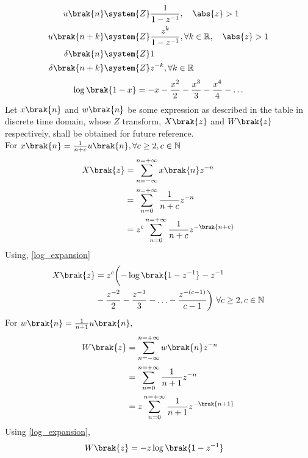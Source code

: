 \begin{table}[ht]

\end{table}
\begin{align}
	u\brak{n} &\system{Z} \frac{1}{1-z^{-1}} , \quad \abs{z} > 1\\
	u\brak{n+k} &\system{Z} \frac{z^k}{1-z^{-1}}, \forall k\in \mathbb{R}, \quad \abs{z} > 1  \label{Z_trans_pair}\\
	\delta\brak{n} &\system{Z} 1 \\
	\delta\brak{n+k} &\system{Z}z^{-k} ,\forall k\in \mathbb{R} \label{11027_eq2}
\end{align}
\begin{align}
        \log\brak{1-x} = -x - \frac{x^2}{2} - \frac{x^3}{3}-\frac{x^4}{4}- \ldots \label{log_expansion}
\end{align}
Let $x\brak{n}$ and $w\brak{n}$ be some expression as described in the table in discrete time domain, whose $Z$ transform, $X\brak{z}$ and $W\brak{z}$ respectively, shall be obtained for future reference.\\
For  $x\brak{n} = \frac{1}{n+c} u\brak{n},\forall c \geq 2,c \in \mathbb{N}$
\begin{align}
    X\brak{z} &= \sum_{n= -\infty}^{n= +\infty} x\brak{n}z^{-n}\\
    &=\sum_{n = 0}^{n = +\infty} \frac{1}{n+c}z^{-n}\\
    &= z^c\sum_{n = 0}^{n = +\infty} \frac{1}{n+c}z^{-\brak{n+c}}
\end{align}
Using, \eqref{log_expansion}
\begin{align}
    X\brak{z}&= z^c \biggl(-\log\brak{1-z^{-1}}- z^{-1}\notag\\& -\frac{z^{-2}}{2}-\frac{z^{-3}}{3} - \ldots -\frac{z^{-(c-1)}}{c-1} \biggr)\ \forall c \geq 2, c \in \mathbb{N} \label{11027_eq1}
\end{align} 
For $w\brak{n} = \frac{1}{n+1}u\brak{n},$\\
\begin{align}
	W\brak{z} &=\sum_{n= -\infty}^{n= +\infty} w\brak{n}z^{-n}\\
	&= \sum_{n = 0}^{n = +\infty} \frac{1}{n+1}z^{-n}\\
	&= z\sum_{n = 0}^{n = +\infty} \frac{1}{n+1}z^{-\brak{n+1}} 
\end{align}
Using \eqref{log_expansion},
\begin{align}
	W\brak{z}&= -z\log\brak{1-z^{-1}} \label{When_c_equals_1}	
\end{align}
\\
